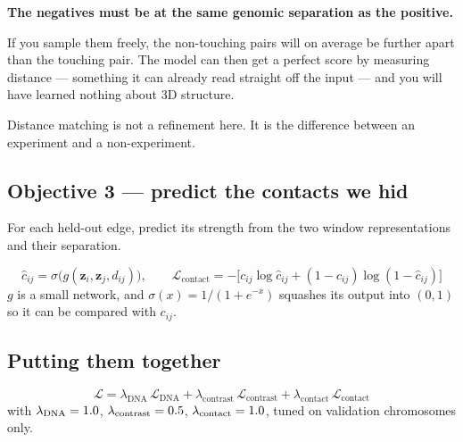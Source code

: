 \documentclass[11pt,a4paper]{article}
\newcommand{\zvec}[1]{\mathbf{z}_{#1}}
\begin{document}
\begin{carefulbox}
\textbf{The negatives must be at the same genomic separation as the positive.}

If you sample them freely, the non-touching pairs will on average be further
apart than the touching pair. The model can then get a perfect score by measuring
distance --- something it can already read straight off the input --- and you will
have learned nothing about 3D structure.

Distance matching is not a refinement here. It is the difference between an
experiment and a non-experiment.
\end{carefulbox}

\subsection{Objective 3 --- predict the contacts we hid}

For each held-out edge, predict its strength from the two window representations
and their separation.

\begin{mathbox}
\begin{equation}
\hat{c}_{ij} = \sigma\!\big(g(\zvec{i}, \zvec{j}, d_{ij})\big),
\qquad
\mathcal{L}_{\mathrm{contact}}
= -\Big[c_{ij}\log \hat{c}_{ij} + (1 - c_{ij})\log(1 - \hat{c}_{ij})\Big]
\end{equation}
$g$ is a small network, and $\sigma(x) = 1/(1+e^{-x})$ squashes its output into
$(0,1)$ so it can be compared with $c_{ij}$.
\end{mathbox}

\subsection{Putting them together}

\begin{mathbox}
\begin{equation}
\mathcal{L}
= \lambda_{\mathrm{DNA}}\,\mathcal{L}_{\mathrm{DNA}}
+ \lambda_{\mathrm{contrast}}\,\mathcal{L}_{\mathrm{contrast}}
+ \lambda_{\mathrm{contact}}\,\mathcal{L}_{\mathrm{contact}}
\end{equation}
with $\lambda_{\mathrm{DNA}} = 1.0$,
$\lambda_{\mathrm{contrast}} = 0.5$,
$\lambda_{\mathrm{contact}} = 1.0$, tuned on validation chromosomes
only.
\end{mathbox}

\end{document}

